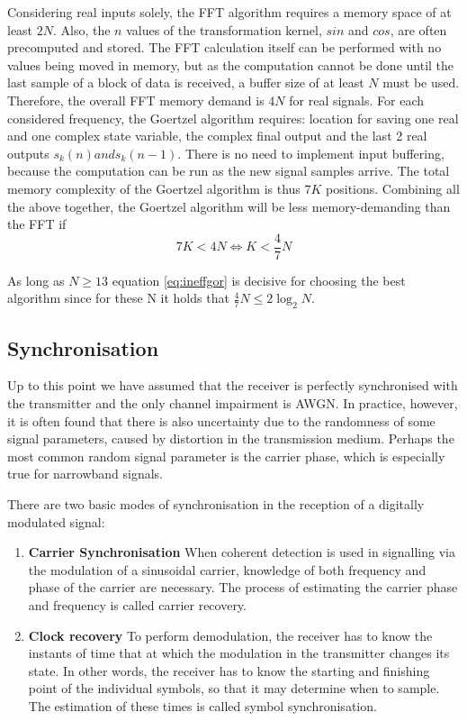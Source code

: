 \documentclass[12pt,a4paper,openright]{article}
\begin{document}
Considering real inputs solely, the FFT algorithm requires a memory space of at least $2N$. Also, the $n$ values of the transformation kernel, $sin$ and $cos$, are often precomputed and stored. The FFT calculation itself can be performed with no values being moved in memory, but as the computation cannot be done until the last sample of a block of data is received, a buffer size of at least $N$ must be used. Therefore, the overall FFT memory demand is $4N$ for real signals.
For each considered frequency, the Goertzel algorithm requires: location for saving one real and one complex state variable, the complex final output and the last 2 real outputs $s_k(n) and s_k(n-1)$. There is no need to implement input buffering, because the computation can be run as the new signal samples arrive. The total memory complexity of the Goertzel algorithm is thus $7K$ positions. Combining all the above together, the Goertzel algorithm will be less memory-demanding than the FFT if \cite{GoertzelPaper}
\[7K < 4N \Leftrightarrow K < \frac{4}{7}N\]

As long as $N\geq 13$ equation \ref{eq:ineffgor} is decisive for choosing the best algorithm since for these N it holds that $\frac{4}{7} N \leq 2 \log_2 N$.

\subsection{Synchronisation}
\label{subsec:ts}
Up to this point we have assumed that the receiver is perfectly synchronised with the transmitter and the only channel impairment is AWGN. In practice, however, it is often found that there is also uncertainty due to the randomness of some signal parameters, caused by distortion in the transmission medium. Perhaps the most common random signal parameter is the carrier phase, which is especially true for narrowband signals. 

There are two basic modes of synchronisation in the reception of a digitally modulated signal:
\begin{enumerate}
\item \textbf{Carrier Synchronisation}  When coherent detection is used in signalling via the modulation of a sinusoidal carrier, knowledge of both  
frequency and phase of the carrier are necessary. 
The process of estimating the carrier phase and frequency is called carrier recovery. 

\item \textbf{Clock recovery} To perform demodulation, the receiver has to know the instants of time that at which the modulation in the transmitter changes its state. In other words, the receiver has to know the starting and finishing point of the individual symbols, so that it may determine when to sample. The estimation of these times is called symbol synchronisation.
\end{enumerate}
\end{document}
